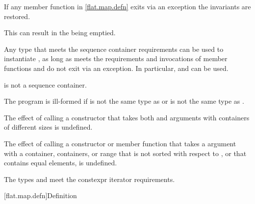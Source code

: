 \pnum
If any member function in \ref{flat.map.defn} exits via an exception
the invariants are restored.
\begin{note}
This can result in the  being emptied.
\end{note}

\pnum
Any type 
that meets the sequence container requirements
can be used to instantiate ,
as long as
 meets the  requirements and
invocations of
member functions  and  do not exit via an exception.
In particular,  and 
can be used.
\begin{note}
 is not a sequence container.
\end{note}

\pnum
The program is ill-formed if
 is not the same type as  or
 is not the same type as .

\pnum
The effect of calling a constructor
that takes
both  and  arguments with
containers of different sizes is undefined.

\pnum
The effect of calling a constructor or member function
that takes a  argument with
a container, containers, or range
that is not sorted with respect to , or
that contains equal elements,
is undefined.

\pnum
The types  and  meet
the constexpr iterator requirements.

[flat.map.defn]{Definition}

